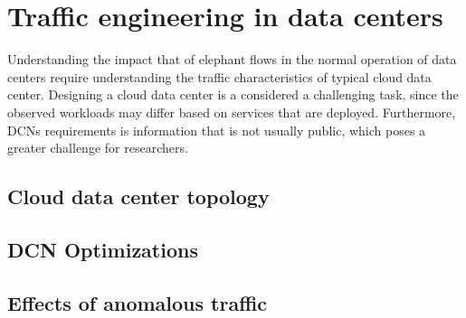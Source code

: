 \section {Traffic engineering in data centers}

Understanding the impact that of elephant flows in the normal operation of data centers require understanding the traffic characteristics of typical cloud data center. Designing a cloud data center is a considered a 
challenging task, since the observed workloads may differ based on services that are deployed. Furthermore, DCNs requirements is information that is not usually public, which poses a greater challenge for researchers.

\subsection {Cloud data center topology} 
\subsection {DCN Optimizations} 
\subsection {Effects of anomalous traffic} 
